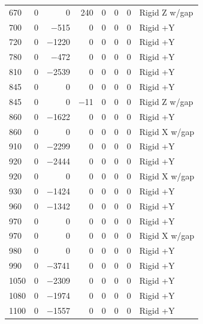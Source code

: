 \begin{longtable}{lrrrrrrl}
    670 & \num{0} & \num{0} & \num{240} & \num{0} & \num{0} & \num{0} & Rigid Z w/gap \\
    700 & \num{0} & \num{-515} & \num{0} & \num{0} & \num{0} & \num{0} & Rigid +Y \\
    720 & \num{0} & \num{-1220} & \num{0} & \num{0} & \num{0} & \num{0} & Rigid +Y \\
    780 & \num{0} & \num{-472} & \num{0} & \num{0} & \num{0} & \num{0} & Rigid +Y \\
    810 & \num{0} & \num{-2539} & \num{0} & \num{0} & \num{0} & \num{0} & Rigid +Y \\
    845 & \num{0} & \num{0} & \num{0} & \num{0} & \num{0} & \num{0} & Rigid +Y \\
    845 & \num{0} & \num{0} & \num{-11} & \num{0} & \num{0} & \num{0} & Rigid Z w/gap \\
    860 & \num{0} & \num{-1622} & \num{0} & \num{0} & \num{0} & \num{0} & Rigid +Y \\
    860 & \num{0} & \num{0} & \num{0} & \num{0} & \num{0} & \num{0} & Rigid X w/gap \\
    910 & \num{0} & \num{-2299} & \num{0} & \num{0} & \num{0} & \num{0} & Rigid +Y \\
    920 & \num{0} & \num{-2444} & \num{0} & \num{0} & \num{0} & \num{0} & Rigid +Y \\
    920 & \num{0} & \num{0} & \num{0} & \num{0} & \num{0} & \num{0} & Rigid X w/gap \\
    930 & \num{0} & \num{-1424} & \num{0} & \num{0} & \num{0} & \num{0} & Rigid +Y \\
    960 & \num{0} & \num{-1342} & \num{0} & \num{0} & \num{0} & \num{0} & Rigid +Y \\
    970 & \num{0} & \num{0} & \num{0} & \num{0} & \num{0} & \num{0} & Rigid +Y \\
    970 & \num{0} & \num{0} & \num{0} & \num{0} & \num{0} & \num{0} & Rigid X w/gap \\
    980 & \num{0} & \num{0} & \num{0} & \num{0} & \num{0} & \num{0} & Rigid +Y \\
    990 & \num{0} & \num{-3741} & \num{0} & \num{0} & \num{0} & \num{0} & Rigid +Y \\
    1050 & \num{0} & \num{-2309} & \num{0} & \num{0} & \num{0} & \num{0} & Rigid +Y \\
    1080 & \num{0} & \num{-1974} & \num{0} & \num{0} & \num{0} & \num{0} & Rigid +Y \\
    1100 & \num{0} & \num{-1557} & \num{0} & \num{0} & \num{0} & \num{0} & Rigid +Y \\

\end{longtable}
